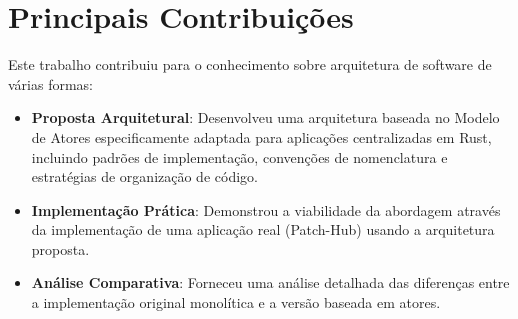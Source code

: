 \section{Principais Contribuições}

Este trabalho contribuiu para o conhecimento sobre arquitetura de software de várias formas:

\begin{itemize}
    \item \textbf{Proposta Arquitetural}: Desenvolveu uma arquitetura baseada no Modelo de Atores especificamente adaptada para aplicações centralizadas em Rust, incluindo padrões de implementação, convenções de nomenclatura e estratégias de organização de código.
    
    \item \textbf{Implementação Prática}: Demonstrou a viabilidade da abordagem através da implementação de uma aplicação real (Patch-Hub) usando a arquitetura proposta.
    
    \item \textbf{Análise Comparativa}: Forneceu uma análise detalhada das diferenças entre a implementação original monolítica e a versão baseada em atores.
\end{itemize}
